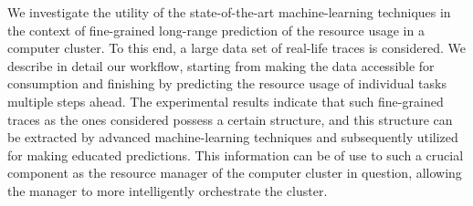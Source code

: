 We investigate the utility of the state-of-the-art machine-learning techniques
in the context of fine-grained long-range prediction of the resource usage in a
computer cluster. To this end, a large data set of real-life traces is
considered. We describe in detail our workflow, starting from making the data
accessible for consumption and finishing by predicting the resource usage of
individual tasks multiple steps ahead. The experimental results indicate that
such fine-grained traces as the ones considered possess a certain structure, and
this structure can be extracted by advanced machine-learning techniques and
subsequently utilized for making educated predictions. This information can be
of use to such a crucial component as the resource manager of the computer
cluster in question, allowing the manager to more intelligently orchestrate the
cluster.
